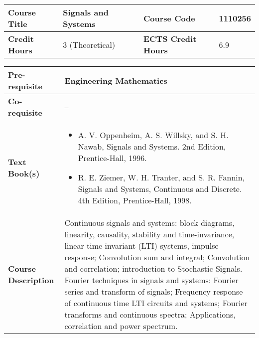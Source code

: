 \documentclass[12pt]{article}
\begin{document}
\bigskip
\bigskip


\begin{minipage}{\textwidth}
\begin{tabularx}{\textwidth}{|l|X|l|X|}
\hline
\textbf{Course Title}       &  Signals and Systems & \textbf{Course Code}       &   1110256 \\ \hline
\textbf{Credit Hours}       & 3  (Theoretical) & \textbf{ECTS Credit Hours}       &  6.9 \\ \hline
\end{tabularx}

\begin{tabularx}{\textwidth}{|l|X|}
\hline
\textbf{Pre-requisite}      &  Engineering Mathematics \\ \hline
\textbf{Co-requisite}       &  -- \\ \hline
\textbf{Text Book(s)}      & \begin{minipage}{.70\textwidth}
					\begin{itemize} \itemsep-0.4em
						\vspace{3mm}
						\item A. V. Oppenheim, A. S. Willsky, and S. H. Nawab, Signals and Systems. 2nd Edition, Prentice-Hall, 1996.
						\item R. E. Ziemer, W. H. Tranter, and S. R. Fannin, Signals and Systems, Continuous and Discrete. 4th Edition, Prentice-Hall, 1998.
						\vspace{3mm}
					\end{itemize}
				\end{minipage}  \\ \hline
\textbf{Course Description} & \begin{minipage}{.70\textwidth}
					\vspace{3mm}
					Continuous signals and systems: block diagrams, linearity, causality, stability and time-invariance, linear time-invariant (LTI) systems, impulse response; Convolution sum and integral; Convolution and correlation; introduction to Stochastic Signals. Fourier techniques in signals and systems: Fourier series and transform of signals; Frequency response of continuous time LTI circuits and systems; Fourier transforms and continuous spectra; Applications, correlation and power spectrum. 

					\vspace{3mm}
					\end{minipage} \\ \hline
\end{tabularx}
\end{minipage}
\end{document}
